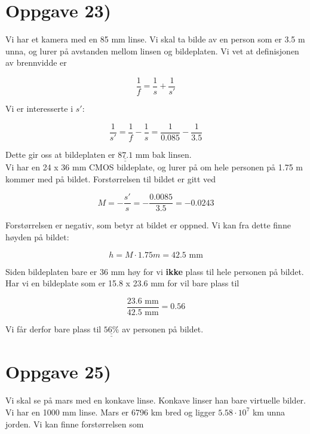 \documentclass[a4paper,norsk, 10pt]{article}
\begin{document}
\newpage

\section*{Oppgave 23)}

Vi har et kamera med en 85 mm linse. Vi skal ta bilde av en person som er 3.5 m unna, og lurer på avstanden mellom linsen og bildeplaten. Vi vet at definisjonen av brennvidde er 

\begin{equation}
\frac{1}{f} = \frac{1}{s} + \frac{1}{s'}
\end{equation}

Vi er interesserte i $s'$:

$$
 \frac{1}{s'} = \frac{1}{f} - \frac{1}{s} = \frac{1}{0.085} - \frac{1}{3.5}
$$

Dette gir oss at bildeplaten er $\underline{\underline{87.1}}$ mm bak linsen.\\

Vi har en 24 x 36 mm CMOS bildeplate, og lurer på om hele personen på 1.75 m kommer med på bildet. Forstørrelsen til bildet er gitt ved

\begin{equation}
M = -\frac{s'}{s} = -\frac{0.0085}{3.5} = -0.0243
\end{equation}

Forstørrelsen er negativ, som betyr at bildet er oppned. Vi kan fra dette finne høyden på bildet:

\begin{equation}
h = M \cdot 1.75m = 42.5 \text{ mm}
\end{equation}

Siden bildeplaten bare er 36 mm høy for vi \textbf{ikke} plass til hele personen på bildet.\\

Har vi en bildeplate som er 15.8 x 23.6 mm for vil bare plass til 

$$
\frac{23.6 \text{ mm}}{42.5 \text{ mm}} = 0.56
$$

Vi får derfor bare plass til $\underline{\underline{56 \%}}$ av personen på bildet.

\section*{Oppgave 25)}

Vi skal se på mars med en konkave linse. Konkave linser han bare virtuelle bilder. Vi har en 1000 mm linse. Mars er 6796 km bred og ligger $5.58 \cdot 10^7$ km unna jorden. Vi kan finne forstørrelsen som 
\end{document}
